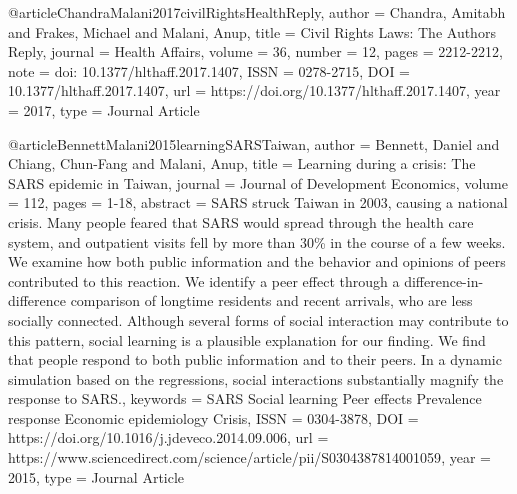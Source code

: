 @article{ChandraMalani2017civilRightsHealthReply,
   author = {Chandra, Amitabh and Frakes, Michael and Malani, Anup},
   title = {Civil Rights Laws: The Authors Reply},
   journal = {Health Affairs},
   volume = {36},
   number = {12},
   pages = {2212-2212},
   note = {doi: 10.1377/hlthaff.2017.1407},
   ISSN = {0278-2715},
   DOI = {10.1377/hlthaff.2017.1407},
   url = {https://doi.org/10.1377/hlthaff.2017.1407},
   year = {2017},
   type = {Journal Article}
}



@article{BennettMalani2015learningSARSTaiwan,
   author = {Bennett, Daniel and Chiang, Chun-Fang and Malani, Anup},
   title = {Learning during a crisis: The SARS epidemic in Taiwan},
   journal = {Journal of Development Economics},
   volume = {112},
   pages = {1-18},
   abstract = {SARS struck Taiwan in 2003, causing a national crisis. Many people feared that SARS would spread through the health care system, and outpatient visits fell by more than 30\% in the course of a few weeks. We examine how both public information and the behavior and opinions of peers contributed to this reaction. We identify a peer effect through a difference-in-difference comparison of longtime residents and recent arrivals, who are less socially connected. Although several forms of social interaction may contribute to this pattern, social learning is a plausible explanation for our finding. We find that people respond to both public information and to their peers. In a dynamic simulation based on the regressions, social interactions substantially magnify the response to SARS.},
   keywords = {SARS
Social learning
Peer effects
Prevalence response
Economic epidemiology
Crisis},
   ISSN = {0304-3878},
   DOI = {https://doi.org/10.1016/j.jdeveco.2014.09.006},
   url = {https://www.sciencedirect.com/science/article/pii/S0304387814001059},
   year = {2015},
   type = {Journal Article}
}

